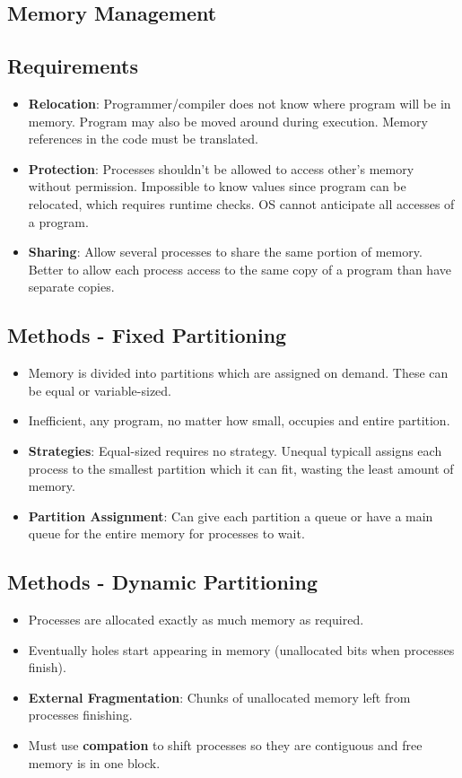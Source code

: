 \documentclass[fontsize=5pt]{scrartcl}
\begin{document}
\begin{multicols}{3}
   \section{Memory Management}
      \subsection{Requirements}
        \begin{itemize}
          \item \textbf{Relocation}: Programmer/compiler does not know where program will be in memory. Program may also be 
                    moved around during execution. Memory references in the code must be translated.
          \item \textbf{Protection}: Processes shouldn't be allowed to access other's memory without permission. Impossible to know
                    values since program can be relocated, which requires runtime checks. OS cannot anticipate all accesses of a program.
          \item \textbf{Sharing}: Allow several processes to share the same portion of memory. Better to allow each
                    process access to the same copy of a program than have separate copies.
        \end{itemize}
        \subsection{Methods - Fixed Partitioning}
        \begin{itemize}
          \item Memory is divided into partitions which are assigned on demand. These can be equal or variable-sized.
          \item Inefficient, any program, no matter how small, occupies and entire partition.  
          \item \textbf{Strategies}: Equal-sized requires no strategy. Unequal typicall assigns each process to the smallest partition which it can fit,
                wasting the least amount of memory.
          \item \textbf{Partition Assignment}: Can give each partition a queue or have a main queue for the entire memory for processes to wait.
        \end{itemize}
        \subsection{Methods - Dynamic Partitioning}
        \begin{itemize}
          \item Processes are allocated exactly as much memory as required.
          \item Eventually holes start appearing in memory (unallocated bits when processes finish).
          \item \textbf{External Fragmentation}: Chunks of unallocated memory left from processes finishing.
          \item Must use \textbf{compation} to shift processes so they are contiguous and free memory is in one block.
        \end{itemize}

\end{multicols}
\end{document}
